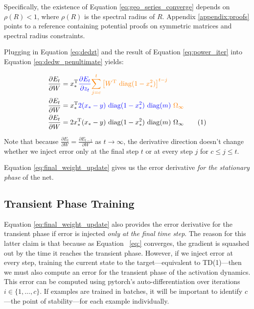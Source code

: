 \documentclass[11pt,letterpaper]{article}
\newcommand{\T}{{\ensuremath{\mathrm{T}}}}
\newcommand{\diag}{{\ensuremath{\mathrm{diag}}}}
\theoremstyle{definition}
\newcommand{\highlight}[2]{\textcolor{#1}{#2}}
\newcommand\numberthis{\addtocounter{equation}{1}\tag{\theequation}}
\begin{document}
Specifically, the existence of Equation \ref{eq:geo_series_converge} depends on $\rho(R) < 1$, where $\rho(R)$ is the spectral radius of $R$. Appendix \ref{appendix:proofs} points to a reference containing potential proofs on symmetric matrices and spectral radius constraints.


Plugging in Equation \ref{eq:dedzt} and the result of Equation \ref{eq:power_iter} into Equation \ref{eq:dedw_penultimate} yields:

\begin{align*}
\frac{\partial E_t}{\partial W} &= x_*^{\T} \highlight{blue}{\frac{\partial E_t}{\partial z_t}}  \highlight{orange}{\sum_{j=c}^t  \left[ W^{\T} ~\diag(1-x_*^2) \right] ^{t-j}} \\
\frac{\partial E_t}{\partial W} &= x_*^{\T} \highlight{blue}{2 (x_* - y) ~\diag (1 - x_*^2) ~\diag(m)} \highlight{orange}{~\Omega_\infty} \\
\frac{\partial E_t}{\partial W} &= 2x_*^{\T} (x_* - y) ~\diag (1 - x_*^2) ~\diag(m)~\Omega_\infty \numberthis 
\label{eq:final_weight_update}
\end{align*}


Note that because $\frac{\partial E_t}{\partial W} = \frac{\partial E_{t-1}}{\partial W}$ as $t \rightarrow \infty$, the derivative direction doesn't change whether we inject error only at the final step $t$ or at every step $j$ for $c \le j \le t$.

Equation \ref{eq:final_weight_update} gives us the error derivative \textit{for the stationary phase} of the net. 

\subsection{Transient Phase Training}
Equation \ref{eq:final_weight_update} also provides the error derivative for the transient phase if error is injected \textit{only at the final time step}. The reason for this latter claim is that because as Equation ~\ref{eq:} converges, the gradient is squashed out by the time it reaches the transient phase. However, if we inject error at every step, training the current state to the target---equivalent to TD(1)---then we must also compute an error for the transient phase of the activation dynamics. This error can be computed using pytorch’s auto-differentiation over iterations $i \in \{1, ..., c\}$. If examples are trained in batches, it will be important to identify $c$---the point of stability---for each example individually.
\end{document}

